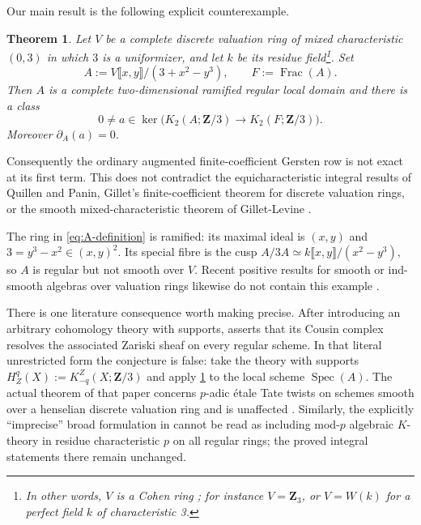 \documentclass[10pt]{amsart}
\DeclareMathOperator{\Frac}{Frac}
\DeclareMathOperator{\Spec}{Spec}
\newtheorem{theorem}{Theorem}[section]
\theoremstyle{remark}
\begin{document}
Our main result is the following explicit counterexample.

\begin{theorem}\label{thm:main}
	Let $V$ be a complete discrete valuation ring of mixed characteristic
	$(0,3)$ in which $3$ is a uniformizer, and let $k$ be its residue field\footnote{In other words, $V$ is a Cohen ring \cite[Tag~0327]{StacksProject}; for instance $V=\mathbf Z_3$, or $V=W(k)$ for a perfect field $k$ of
		characteristic 3.}.
	Set
	\begin{equation}\label{eq:A-definition}
		A:=V\llbracket x,y\rrbracket/(3+x^2-y^3),\qquad F:=\Frac(A).
	\end{equation}
	Then $A$ is a complete two-dimensional ramified regular local domain and
	there is a class
	\[
	0\ne a\in\ker\bigl(K_2(A;\mathbf Z/3)\longrightarrow
	K_2(F;\mathbf Z/3)\bigr).
	\]
	Moreover $\partial_A(a)=0$.
\end{theorem}


Consequently the ordinary augmented finite-coefficient Gersten row is not
exact at its first term.  
This does not contradict the equicharacteristic integral results of
Quillen and Panin, Gillet's finite-coefficient theorem for discrete
valuation rings, or the smooth mixed-characteristic theorem of
Gillet-Levine
\cite{Quillen73,Panin03,Gillet86,GilletLevine87}.

 The ring in \eqref{eq:A-definition} is ramified: its maximal ideal is
 \((x,y)\) and
 \(
 3=y^3-x^2\in(x,y)^2.
 \)
 Its special fibre is the cusp
 \(
 A/3A\simeq k\llbracket x,y\rrbracket/(x^2-y^3),
 \)
 so \(A\) is regular but not smooth over \(V\).  Recent positive results
 for smooth or ind-smooth
 algebras over valuation rings likewise do not contain this example
\cite{BouisKunduBL,Kundu24SmoothValuation}.

There is one literature consequence worth making precise.  After
introducing an arbitrary cohomology theory with supports,
\cite[Conj.~1.1]{LuedersPAdic24} asserts that its Cousin complex resolves
the associated Zariski sheaf on every regular scheme.  In that literal
unrestricted form the conjecture is false: take the theory with supports
$H_Z^q(X):=K_{-q}^Z(X;\mathbf Z/3)$ and apply \cref{thm:main} to the local
scheme $\Spec(A)$.  The actual theorem of that paper concerns $p$-adic
\'etale Tate twists on schemes smooth over a henselian discrete valuation
ring and is unaffected \cite[Thm.~1.2]{LuedersPAdic24}.  Similarly, the
explicitly ``imprecise'' broad formulation in
\cite[Conj.~1.1]{Kundu24SmoothValuation} cannot be read as including mod-$p$ algebraic $K$-theory in residue characteristic $p$ on all
regular rings; the proved integral statements there remain unchanged. 
\end{document}
